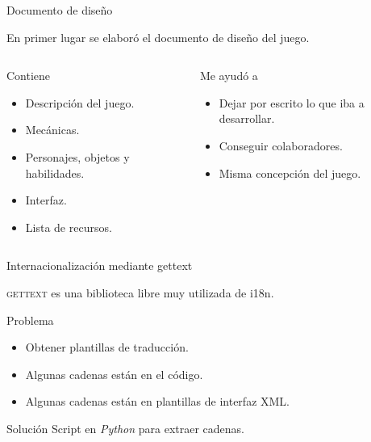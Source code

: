 \documentclass[green]{beamer}
\begin{document}
\begin{frame}{Documento de diseño}

    
    En primer lugar se elaboró el documento de diseño del juego.

    \begin{columns}[t]
    \column{150pt}
        
	\begin{block}{Contiene}
            \begin{itemize}
                \item Descripción del juego.
		\item Mecánicas.
		\item Personajes, objetos y habilidades.
		\item Interfaz.
		\item Lista de recursos.
            \end{itemize}            
        \end{block}

    \column{150pt}
        
	\begin{block}{Me ayudó a}
            \begin{itemize}
                \item Dejar por escrito lo que iba a desarrollar.
		\item Conseguir colaboradores.
		\item Misma concepción del juego.
            \end{itemize}            
        \end{block}
    \end{columns} 
    
\end{frame}
    
    
\begin{frame}{Internacionalización mediante gettext}
    
    \textsc{gettext} es una biblioteca libre muy utilizada de i18n.
    
    \begin{alertblock}{Problema}
	\begin{itemize}
	    \item Obtener plantillas de traducción.
	    \item Algunas cadenas están en el código.
	    \item Algunas cadenas están en plantillas de interfaz XML.
	\end{itemize}
    \end{alertblock}
    
    \begin{block}{Solución}
	Script en \textit{Python} para extraer cadenas.
    \end{block}
    
\end{frame}
    
\end{document}

